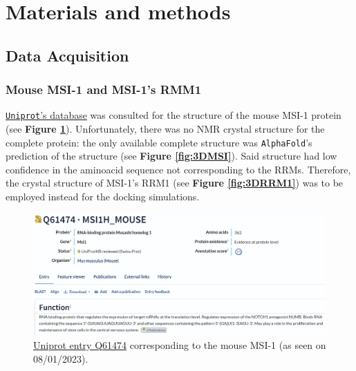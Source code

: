 \section{Materials and methods}

 
 

\subsection{Data Acquisition}

\subsubsection{Mouse MSI-1 and MSI-1's RMM1}

\href{https://www.uniprot.org/}{\texttt{Uniprot}'s database} was consulted for the structure of the mouse MSI-1 protein (see \textbf{Figure \ref{fig:Q61474uniprot}}). Unfortunately, there was no NMR crystal structure for the complete protein: the only available complete structure was \texttt{AlphaFold}'s prediction of the structure (see \textbf{Figure \ref{fig:3DMSI}}). Said structure had low confidence in the aminoacid sequence not corresponding to the RRMs. Therefore, the crystal structure of MSI-1's RRM1 (see \textbf{Figure \ref{fig:3DRRM1}}) was to be employed instead for the docking simulations.

\begin{figure}[htbp!]
    \centering
    \includegraphics[width=\linewidth]{assets/Q61474_uniprot_entry.png}
    \caption[\href{https://www.uniprot.org/uniprotkb/Q61474/entry}{Uniprot entry Q61474} corresponding to the mouse MSI-1.]{\href{https://www.uniprot.org/uniprotkb/Q61474/entry}{Uniprot entry Q61474} corresponding to the mouse MSI-1 (as seen on 08/01/2023).}
    \label{fig:Q61474uniprot}
\end{figure}

